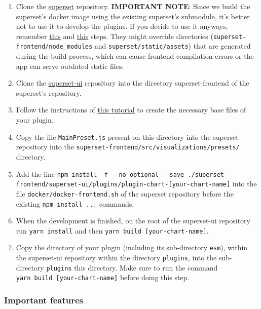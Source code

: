 \documentclass[
]{book}
\begin{document}
\begin{enumerate}
\def\labelenumi{\arabic{enumi}.}
\item
  Clone the \href{https://github.com/apache/superset}{superset} repository.
  \textbf{IMPORTANT NOTE}: Since we build the superset's docker image using the existing superset's submodule, it's better not to use it to develop the plugins.
  If you decide to use it anyways, remember \href{https://github.com/EHDEN/NetworkDashboards/blob/master/docker/superset/Dockerfile\#L54}{this} and \href{https://github.com/EHDEN/NetworkDashboards/blob/master/docker/superset/Dockerfile\#L99}{this} steps.
  They might override directories (\texttt{superset-frontend/node\_modules} and \texttt{superset/static/assets}) that are generated during the build process, which can cause frontend compilation errors or the app can serve outdated static files.
\item
  Clone the \href{https://github.com/apache-superset/superset-ui}{superset-ui} repository into the directory superset-frontend of the superset's repository.
\item
  Follow the instructions of \href{https://superset.apache.org/docs/installation/building-custom-viz-plugins}{this tutorial} to create the necessary base files of your plugin.
\item
  Copy the file \texttt{MainPreset.js} present on this directory into the superset repository into the \texttt{superset-frontend/src/visualizations/presets/} directory.
\item
  Add the line \texttt{npm\ install\ -f\ -\/-no-optional\ -\/-save\ ./superset-frontend/superset-ui/plugins/plugin-chart-{[}your-chart-name{]}} into the file \texttt{docker/docker-frontend.sh} of the superset repository before the existing \texttt{npm\ install\ ...} commands.
\item
  When the development is finished, on the root of the superset-ui repository run \texttt{yarn\ install} and then \texttt{yarn\ build\ {[}your-chart-name{]}}.
\item
  Copy the directory of your plugin (including its sub-directory \texttt{esm}), within the superset-ui repository within the directory \texttt{plugins}, into the sub-directory \texttt{plugins} this directory.
  Make sure to run the command \texttt{yarn\ build\ {[}your-chart-name{]}} before doing this step.
\end{enumerate}

\hypertarget{important-features}{%
\subsubsection*{Important features}\label{important-features}}
\end{document}
